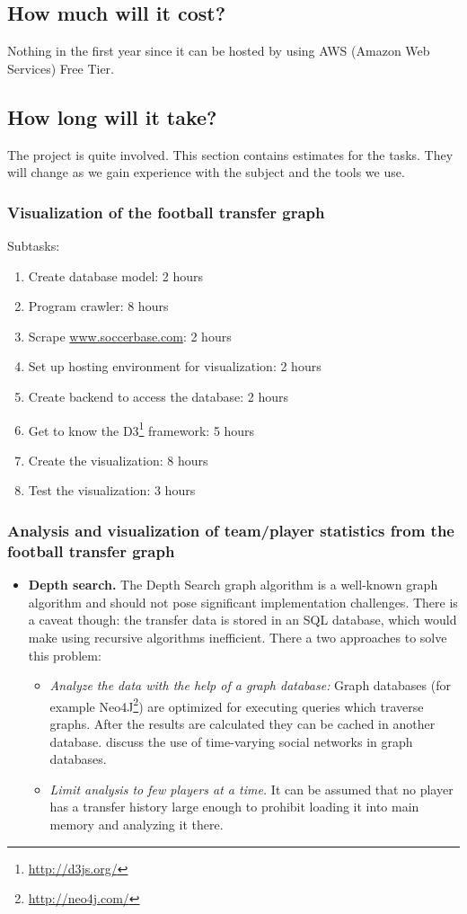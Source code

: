 \documentclass{article}
\begin{document}
\subsection{How much will it cost?}
Nothing in the first year since it can be hosted by using AWS (Amazon Web Services) Free Tier.

\subsection{How long will it take?}
The project is quite involved. This section contains estimates for the tasks. They will change as we gain experience with the subject and the tools we use.

\subsubsection{Visualization of the football transfer graph}
Subtasks:
\begin{enumerate}
\item Create database model: 2 hours
\item Program crawler: 8 hours
\item Scrape \url{www.soccerbase.com}: 2 hours
\item Set up hosting environment for visualization: 2 hours
\item Create backend to access the database: 2 hours
\item Get to know the D3\footnote{\url{http://d3js.org/}} framework: 5 hours
\item Create the visualization: 8 hours
\item Test the visualization: 3 hours
\end{enumerate}

\subsubsection{Analysis and visualization of team/player statistics from the football transfer graph}
\begin{itemize}
\item \textbf{Depth search.} The Depth Search graph algorithm is a well-known graph algorithm and should not pose significant implementation challenges. There is a caveat though: the transfer data is stored in an SQL database, which would make using recursive algorithms inefficient. There a two approaches to solve this problem:
	\begin{itemize}
	\item \textit{Analyze the data with the help of a graph database:} Graph databases (for example Neo4J\footnote{\url{http://neo4j.com/}}) are optimized for executing queries which traverse graphs. After the results are calculated they can be cached in another database. \cite{Cattuto:2013:TSN:2484425.2484442} discuss the use of time-varying social networks in graph databases.
	\item \textit{Limit analysis to few players at a time.} It can be assumed that no player has a transfer history large enough to prohibit loading it into main memory and analyzing it there.
	\end{itemize}
\end{itemize}
\end{document}
